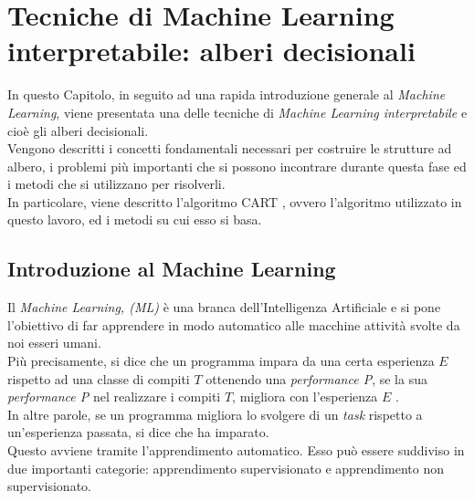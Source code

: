 \chapter{Tecniche di Machine Learning interpretabile: alberi decisionali}
\label{chap:cap2}
In questo Capitolo, in seguito ad una rapida introduzione generale al \textit{Machine Learning}, viene presentata una delle tecniche di \textit{Machine Learning interpretabile} e cioè gli alberi decisionali.\\
Vengono descritti i concetti fondamentali necessari per costruire le strutture ad albero, i problemi più importanti che si possono incontrare durante questa fase ed i metodi che si utilizzano per risolverli.\\
 In particolare, viene descritto l'algoritmo CART \cite{brei:book}, ovvero l'algoritmo utilizzato in questo lavoro, ed i metodi su cui esso si basa.

\section{Introduzione al Machine Learning}
\label{sec:ml}
Il \textit{Machine Learning, (ML)} è una branca dell’Intelligenza Artificiale e si pone l’obiettivo di far apprendere in modo automatico alle macchine attività svolte da noi esseri umani.\\
Più precisamente, si dice che un programma impara da una certa esperienza $E$ rispetto ad una classe di compiti $T$ ottenendo una \textit{performance P}, se la sua \textit{performance P} nel realizzare i compiti $T$, migliora con l’esperienza $E$ \cite{mitch:book}.\\
In altre parole, se un programma migliora lo svolgere di un \textit{task} rispetto a un’esperienza passata, si dice che ha imparato.\\
Questo avviene tramite l'apprendimento automatico. Esso può essere suddiviso in due importanti categorie: apprendimento supervisionato e apprendimento non supervisionato. 

